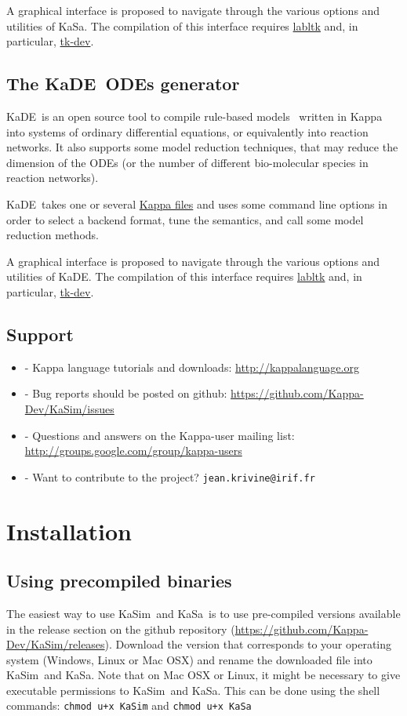 \documentclass[11pt]{book}
\def\KaSim{\textsf{KaSim}}
\def\KaSa{\textsf{KaSa}}
\def\KaDE{\textsf{KaDE}}
\def\ttt#1{\texttt{#1}}
\def\ITE#1{\begin{itemize}#1\end{itemize}}
\begin{document}
A graphical interface is proposed to navigate through the various options and utilities  of \KaSa. The compilation of this interface requires \href{https://forge.ocamlcore.org/projects/labltk/}{labltk} and, in particular,  \href{http://www.tcl.tk/}{tk-dev}.

\section{The \KaDE~ODEs generator}

\KaDE~is an open source tool to compile rule-based models~\cite{DanLan04,Dan_etal07a,Fae_etal05} written in Kappa into systems of ordinary differential equations, or equivalently into reaction networks.
It also supports some model reduction techniques, that may reduce the
dimension of the ODEs (or the number of different bio-molecular species in reaction networks).

\KaDE~takes one or several \hyperref[chap:kappa]{Kappa files} and uses  some command line options in order to select a backend format, tune the semantics, and call some model reduction methods.

A graphical interface is proposed to navigate through the various options and utilities  of \KaDE. The compilation of this interface requires \href{https://forge.ocamlcore.org/projects/labltk/}{labltk} and, in particular,  \href{http://www.tcl.tk/}{tk-dev}.


\section{Support}
\ITE{
\item[-] Kappa language tutorials and downloads: \url{http://kappalanguage.org}
\item[-] Bug reports should be posted on github: \url{https://github.com/Kappa-Dev/KaSim/issues}
\item[-] Questions and answers on the Kappa-user mailing list: \url{http://groups.google.com/group/kappa-users}
\item[-] Want to contribute to the project? \ttt{jean.krivine@irif.fr}
}

\chapter{Installation}\label{chap:install}

\section{Using precompiled binaries}
\label{sec:bin}
The easiest way to use \KaSim~and \KaSa~is to use pre-compiled versions available in the release section on the github repository (\url{https://github.com/Kappa-Dev/KaSim/releases}). Download the version that corresponds to your operating system (Windows, Linux or Mac OSX) and rename the downloaded file into \KaSim~and \KaSa. Note that on Mac OSX or Linux, it might be necessary to give executable permissions to \KaSim~and \KaSa. This can be done using the shell commands:
\ttt{chmod u+x KaSim} and \ttt{chmod u+x KaSa}
\end{document}
